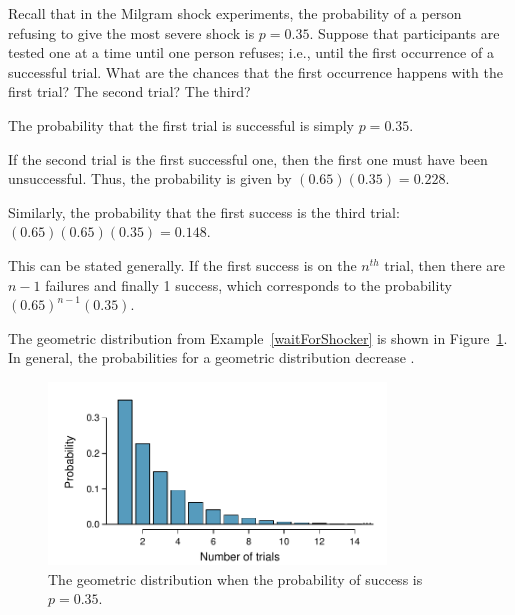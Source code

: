 \begin{example}{Recall that in the Milgram shock experiments, the probability of a person refusing to give the most severe shock is $p = 0.35$. Suppose that participants are tested one at a time until one person refuses; i.e., until the first occurrence of a successful trial. What are the chances that the first occurrence happens with the first trial? The second trial? The third?}\label{waitForShocker}
	
The probability that the first trial is successful is simply $p = 0.35$. 

If the second trial is the first successful one, then the first one must have been unsuccessful. Thus, the probability is given by $(0.65)(0.35) = 0.228$.

Similarly, the probability that the first success is the third trial: $(0.65)(0.65)(0.35) = 0.148$.

This can be stated generally. If the first success is on the $n^{th}$ trial, then there are $n-1$ failures and finally 1 success, which corresponds to the probability $(0.65)^{n-1}(0.35)$.
\end{example}

The geometric distribution from Example~\ref{waitForShocker} is shown in Figure~\ref{geometricDist35}. In general, the probabilities for a geometric distribution decrease .

\begin{figure}[h!]
\centering
\includegraphics[width=0.8\textwidth]{ch_distributions_oi_biostat/figures/geometricDist35/geometricDist35}
\caption{The geometric distribution when the probability of success is $p=0.35$.}
\label{geometricDist35}
\end{figure}

